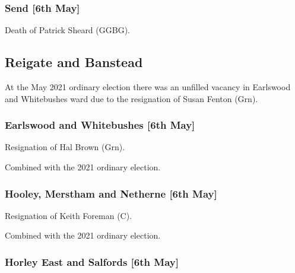 \documentclass[a4paper,openany]{book}
\begin{document}
\begin{resultsiii}
\subsubsection*{Send \hspace*{\fill}\nolinebreak[1]%
	\enspace\hspace*{\fill}
	[6th May]}


Death of Patrick Sheard (GGBG).

\subsection*{Reigate and Banstead}

At the May 2021 ordinary election there was an unfilled vacancy in Earlswood and Whitebushes ward due to the resignation of Susan Fenton (Grn).

\subsubsection*{Earlswood and Whitebushes \hspace*{\fill}\nolinebreak[1]%
	\enspace\hspace*{\fill}
	[6th May]}


Resignation of Hal Brown (Grn).

Combined with the 2021 ordinary election.

\subsubsection*{Hooley, Merstham and Netherne \hspace*{\fill}\nolinebreak[1]%
	\enspace\hspace*{\fill}
	[6th May]}


Resignation of Keith Foreman (C).

Combined with the 2021 ordinary election.

\subsubsection*{Horley East and Salfords \hspace*{\fill}\nolinebreak[1]%
	\enspace\hspace*{\fill}
	[6th May]}


\end{resultsiii}
\end{document}
